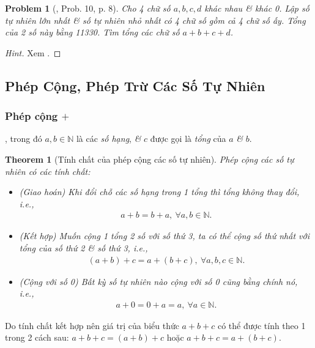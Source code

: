 \documentclass{article}
\numberwithin{equation}{section}
\newtheorem{problem}{Problem}[section]
\newtheorem{theorem}{Theorem}[section]
\begin{document}
\begin{problem}[\cite{Binh_Toan_6_tap_1}, Prob. 10, p. 8]
	Cho 4 chữ số $a,b,c,d$ khác nhau \& khác 0. Lập số tự nhiên lớn nhất \& số tự nhiên nhỏ nhất có 4 chữ số gồm cả 4 chữ số ấy. Tổng của 2 số này bằng 11330. Tìm tổng các chữ số $a + b + c + d$.
\end{problem}

\begin{proof}[Hint]
	Xem \cite[p. 106]{Binh_Toan_6_tap_1}.
\end{proof}

\subsection{Phép Cộng, Phép Trừ Các Số Tự Nhiên}

\subsubsection{Phép cộng $+$}
, trong đó $a,b\in\mathbb{N}$ là các \textit{số hạng}, \textit{\&} $c$ được gọi là \textit{tổng} của $a$ \textit{\&} $b$.

\begin{theorem}[Tính chất của phép cộng các số tự nhiên]
	Phép cộng các số tự nhiên có các tính chất:
	\begin{itemize}
		\item (Giao hoán) Khi đổi chỗ các số hạng trong 1 tổng thì tổng không thay đổi, i.e.,
		\begin{align*}
			a + b = b + a,\ \forall a,b\in\mathbb{N}.
		\end{align*}
		\item (Kết hợp) Muốn cộng 1 tổng 2 số với số thứ 3, ta có thể cộng số thứ nhất với tổng của số thứ 2 \textit{\&} số thứ 3, i.e.,
		\begin{align*}
			(a + b) + c = a +(b + c),\ \forall a,b,c\in\mathbb{N}.
		\end{align*}
		\item (Cộng với số 0) Bất kỳ số tự nhiên nào cộng với số 0 cũng bằng chính nó, i.e.,
		\begin{align*}
			a + 0 = 0 + a = a,\ \forall a\in\mathbb{N}.
		\end{align*}
	\end{itemize}
\end{theorem}
Do tính chất kết hợp nên giá trị của biểu thức $a + b + c$ có thể được tính theo 1 trong 2 cách sau: $a + b + c = (a + b) + c$ hoặc $a + b + c = a + (b + c)$.
\end{document}
